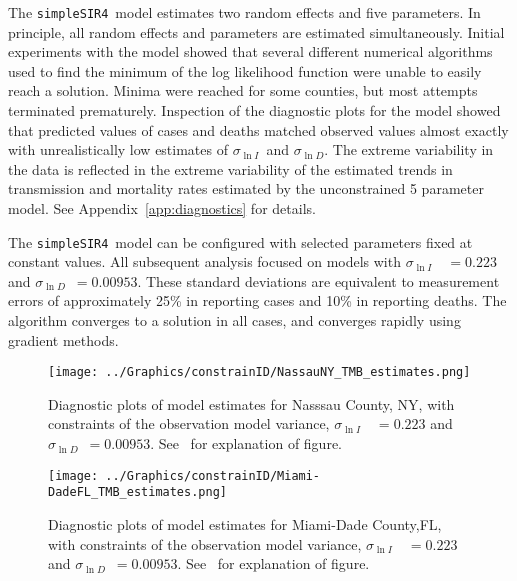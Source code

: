 \documentclass[12pt,letterpaper]{article}
\newcommand\SSm{{\tt simpleSIR4}}
\newcommand\slI{$\sigma_{\ln I}$\ }
\newcommand\slD{$\sigma_{\ln D}$}
\begin{document}
The \SSm\  model estimates two random effects and five parameters.
In principle, all random effects and parameters are estimated
simultaneously.
Initial experiments with the model showed that several different
numerical algorithms used to find the minimum of the log likelihood
function were unable to easily reach a solution. Minima were reached
for some counties, but most attempts terminated prematurely. 
Inspection of the diagnostic plots for the model showed that predicted
values of cases and deaths matched observed values almost exactly
with unrealistically low estimates of \slI and \slD.
The extreme variability in the data is reflected in the extreme
variability of the estimated trends in transmission and mortality
rates estimated by the unconstrained 5 parameter model.
See Appendix~\ref{app:diagnostics} for details.

The \SSm\ model can be configured with selected parameters fixed at
constant values. 
All subsequent analysis focused on models with 
\slI~$ = 0.223$ and \slD~$= 0.00953$. 
These standard deviations are equivalent to measurement errors of
approximately 25\% in reporting cases and 10\% in reporting deaths.
The algorithm converges to a solution in all cases, and converges
rapidly using gradient methods.

\begin{figure}
\begin{center}
\texttt{[image: ../Graphics/constrainID/NassauNY\_TMB\_estimates.png]}
\end{center}
\caption{\label{fig:estsNaNYc}
Diagnostic plots of model estimates for Nasssau County, NY, 
with constraints of the observation model variance, 
\slI~$ = 0.223$ and \slD~$= 0.00953$. 
See~\pageref{pp:diagexpl} for explanation of figure.
}
\end{figure}

\begin{figure}
\begin{center}
\texttt{[image: ../Graphics/constrainID/Miami-DadeFL\_TMB\_estimates.png]}
\end{center}
\caption{\label{fig:estsMDFLc}
Diagnostic plots of model estimates for Miami-Dade County,FL,
with constraints of the observation model variance, 
\slI~$ = 0.223$ and \slD~$= 0.00953$. 
See~\pageref{pp:diagexpl} for explanation of figure.
}
\end{figure}
\end{document}
